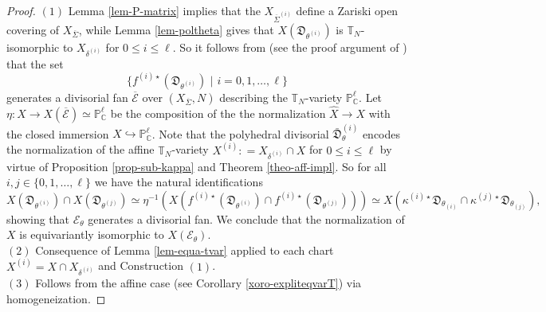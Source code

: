 \documentclass[11pt, reqno]{amsart}
\theoremstyle{plain}
\theoremstyle{definition}
\theoremstyle{remark}
\begin{document}
\begin{proof}
$(1)$ Lemma \ref{lem-P-matrix} implies that the  $X_{\overline{\Sigma}^{(i)}}$ define a Zariski open covering 
of $X_{\overline{\Sigma}}$, while Lemma \ref{lem-poltheta} gives that $X(\mathfrak{D}_{\theta^{(i)}})$ is $\mathbb{T}_{N}$-isomorphic to $X_{\delta^{(i)}}$ for $0\leq i\leq \ell$. So it follows from \cite[Proposition 4.3]{AHS08} (see the proof argument of \cite[Theorem 5.6]{AHS08})
that the set 
$$\{f^{(i)\star}(\mathfrak{D}_{\theta^{(i)}})\,\,|\,\, i = 0,1, \ldots, \ell\}$$
generates a divisorial fan $\overline{\mathscr{E}}$ over $(X_{\overline{\Sigma}}, N)$ describing the $\mathbb{T}_{N}$-variety $\mathbb{P}_{\mathbb{C}}^{\ell}$. Let $\eta: \widehat{X}\rightarrow X(\overline{\mathscr{E}})\simeq \mathbb{P}^{\ell}_{\mathbb{C}}$ be the composition of the the normalization $\widehat{X}\rightarrow X$ with the closed immersion $X\hookrightarrow \mathbb{P}^{\ell}_{\mathbb{C}}$. Note that the polyhedral divisorial $\bar{\mathfrak{D}}_{\theta}^{(i)}$
encodes
the normalization of the affine $\mathbb{T}_{N}$-variety
$X^{(i)}: =  X_{\delta^{(i)}}\cap X$ for $0\leq i\leq \ell$ by virtue of  Proposition \ref{prop-sub-kappa} and Theorem \ref{theo-aff-impl}. So for all $i, j\in \{0, 1, \ldots, \ell\}$ we have the natural identifications
$$X(\mathfrak{D}_{\theta^{(i)}})\cap X(\mathfrak{D}_{\theta^{(j)}}) \simeq \eta^{-1}(X(f^{(i)\star}(\mathfrak{D}_{\theta^{(i)}}) \cap f^{(i)\star}(\mathfrak{D}_{\theta^{(j)}}))) \simeq  X(  \kappa^{(i) \star}\mathfrak{D}_{\theta_{(i)}}\cap   \kappa^{(j) \star}\mathfrak{D}_{\theta_{(j)}}),$$
showing that $\mathscr{E}_{\theta}$ generates a divisorial fan.  We conclude that  the normalization of $X$ is equivariantly isomorphic to $X(\mathscr{E}_{\theta})$. 
\\

$(2)$ Consequence of Lemma \ref{lem-equa-tvar} applied to each chart $X^{(i)} =  X\cap X_{\delta^{(i)}}$ and Construction $(1)$.
\\

$(3)$ Follows from the affine case (see Corollary \ref{xoro-expliteqvarT}) via homogeneization. 
\end{proof}
\end{document}
